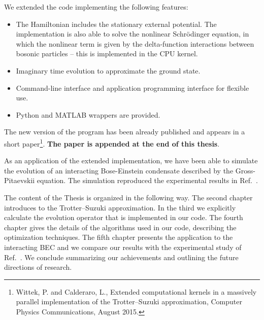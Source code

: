 We extended the code implementing the following features:
\begin{itemize}
\item The Hamiltonian includes the stationary external potential. The implementation is also able to solve the nonlinear Schr\"odinger equation, in which the nonlinear term is given by the delta-function interactions between bosonic particles -- this is implemented in the CPU kernel.

\item Imaginary time evolution to approximate the ground state.

\item Command-line interface and application programming interface for flexible use.

\item Python and MATLAB wrappers are provided.
\end{itemize}
The new version of the program has been already published and appears in a short paper\footnote{Wittek, P. and Calderaro, L., Extended computational kernels in a massively parallel implementation of the Trotter--Suzuki approximation, Computer Physics Communications, August 2015.}. \textbf{The paper is appended at the end of this thesis}.

As an application of the extended implementation, we have been able to simulate the evolution of an interacting Bose-Einstein condensate described by the Gross-Pitaevskii equation. The simulation reproduced the experimental results in Ref.~\citep{DSF00}.

The content of the Thesis is organized in the following way. The second chapter introduces to the Trotter--Suzuki approximation. In the third we explicitly calculate the evolution operator that is implemented in our code. The fourth chapter gives the details of the algorithms used in our code, describing the optimization techniques. The fifth chapter presents the application to the interacting BEC and we compare our results with the experimental study of Ref.~\citep{DSF00}. We conclude summarizing our achievements and outlining the future directions of research.